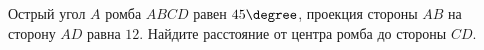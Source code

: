 \begin{ex}
	\begin{condition}
		Острый угол \( A  \) ромба \( ABCD  \) равен \( 45\degree \), проекция стороны \( AB  \) на сторону \( AD  \) равна \( 12 \). Найдите расстояние от центра ромба до стороны \( CD \).
	\end{condition}
\end{ex}
